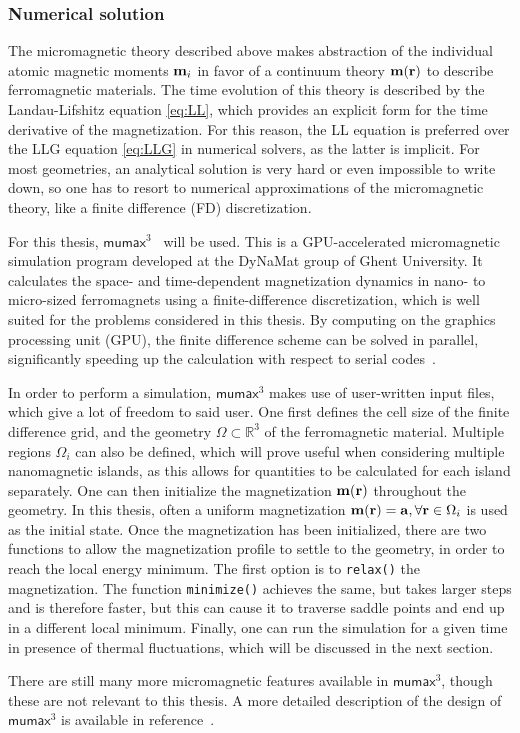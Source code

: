 \documentclass[11pt,a4paper,english]{article}
\newcommand{\code}[1]{\texttt{#1}}
\newcommand{\mumax}{$\mathsf{mumax}^3$}
\begin{document}
\subsubsection{Numerical solution}
The micromagnetic theory described above makes abstraction of the individual atomic magnetic moments $\vb{m}_i$ in favor of a continuum theory $\vb{m}(\vb{r})$ to describe ferromagnetic materials. The time evolution of this theory is described by the Landau-Lifshitz equation \eqref{eq:LL}, which provides an explicit form for the time derivative of the magnetization. For this reason, the LL equation is preferred over the LLG equation \eqref{eq:LLG} in numerical solvers, as the latter is implicit. For most geometries, an analytical solution is very hard or even impossible to write down, so one has to resort to numerical approximations of the micromagnetic theory, like a finite difference (FD) discretization. \par
For this thesis, \mumax{}~\cite{MuMax3} will be used. This is a GPU-accelerated micromagnetic simulation program developed at the DyNaMat group of Ghent University. It calculates the space- and time-dependent magnetization dynamics in nano- to micro-sized ferromagnets using a finite-difference discretization, which is well suited for the problems considered in this thesis. By computing on the graphics processing unit (GPU), the finite difference scheme can be solved in parallel, significantly speeding up the calculation with respect to serial codes~\cite{MicromagneticGPU}. \par
In order to perform a simulation, \mumax{} makes use of user-written input files, which give a lot of freedom to said user. One first defines the cell size of the finite difference grid, and the geometry $\Omega \subset \mathbb{R}^3$ of the ferromagnetic material. Multiple regions $\Omega_i$ can also be defined, which will prove useful when considering multiple nanomagnetic islands, as this allows for quantities to be calculated for each island separately. One can then initialize the magnetization $\vb{m}(\vb{r})$ throughout the geometry. In this thesis, often a uniform magnetization $\vb{m}(\vb{r}) = \vb{a}, \forall \vb{r} \in \Omega_i$ is used as the initial state. Once the magnetization has been initialized, there are two functions to allow the magnetization profile to settle to the geometry, in order to reach the local energy minimum. The first option is to \code{relax()} the magnetization. The function \code{minimize()} achieves the same, but takes larger steps and is therefore faster, but this can cause it to traverse saddle points and end up in a different local minimum. Finally, one can run the simulation for a given time in presence of thermal fluctuations, which will be discussed in the next section. \par
There are still many more micromagnetic features available in \mumax{}, though these are not relevant to this thesis. A more detailed description of the design of \mumax{} is available in reference~\cite{MuMax3}.
\end{document}
